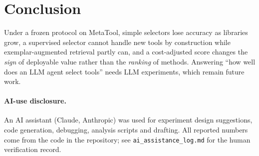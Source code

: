 \documentclass[10pt,twocolumn]{article}
\begin{document}
\section{Conclusion}
Under a frozen protocol on MetaTool, simple selectors lose accuracy as libraries grow, a supervised selector cannot handle new tools by construction while exemplar-augmented retrieval partly can, and a cost-adjusted score changes the \emph{sign} of deployable value rather than the \emph{ranking} of methods. Answering ``how well does an LLM agent select tools'' needs LLM experiments, which remain future work.

\paragraph{AI-use disclosure.} An AI assistant (Claude, Anthropic) was used for experiment design suggestions, code generation, debugging, analysis scripts and drafting. All reported numbers come from the code in the repository; see \texttt{ai\_assistance\_log.md} for the human verification record.


\end{document}
